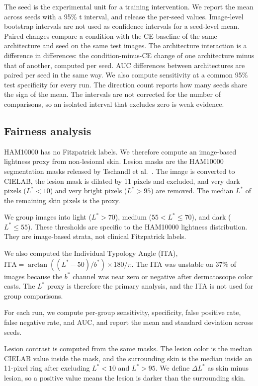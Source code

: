 \documentclass[11pt]{article}
\begin{document}
The seed is the experimental unit for a training intervention. We report the mean across seeds with a 95\% t interval, and release the per-seed values. Image-level bootstrap intervals are not used as confidence intervals for a seed-level mean. Paired changes compare a condition with the CE baseline of the same architecture and seed on the same test images. The architecture interaction is a difference in differences: the condition-minus-CE change of one architecture minus that of another, computed per seed. AUC differences between architectures are paired per seed in the same way. We also compute sensitivity at a common 95\% test specificity for every run. The direction count reports how many seeds share the sign of the mean. The intervals are not corrected for the number of comparisons, so an isolated interval that excludes zero is weak evidence.

\subsection{Fairness analysis}

HAM10000 has no Fitzpatrick labels. We therefore compute an image-based lightness proxy from non-lesional skin. Lesion masks are the HAM10000 segmentation masks released by Tschandl et al.\ \citep{tschandl2020human}. The image is converted to CIELAB, the lesion mask is dilated by 11 pixels and excluded, and very dark pixels ($L^*<10$) and very bright pixels ($L^*>95$) are removed. The median $L^*$ of the remaining skin pixels is the proxy.

We group images into light ($L^*>70$), medium ($55<L^*\leq70$), and dark ($L^*\leq55$). These thresholds are specific to the HAM10000 lightness distribution. They are image-based strata, not clinical Fitzpatrick labels.

We also computed the Individual Typology Angle (ITA), $\mathrm{ITA}=\arctan((L^*-50)/b^*)\times180/\pi$. The ITA was unstable on 37\% of images because the $b^*$ channel was near zero or negative after dermatoscope color casts. The $L^*$ proxy is therefore the primary analysis, and the ITA is not used for group comparisons.

For each run, we compute per-group sensitivity, specificity, false positive rate, false negative rate, and AUC, and report the mean and standard deviation across seeds.

Lesion contrast is computed from the same masks. The lesion color is the median CIELAB value inside the mask, and the surrounding skin is the median inside an 11-pixel ring after excluding $L^*<10$ and $L^*>95$. We define $\Delta L^*$ as skin minus lesion, so a positive value means the lesion is darker than the surrounding skin.
\end{document}
